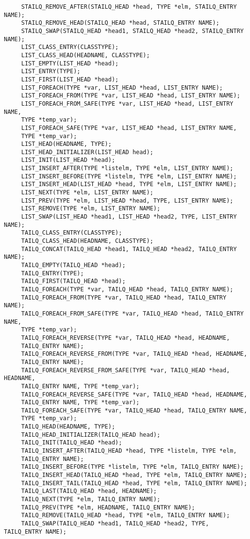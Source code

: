 \documentclass[journal,10pt,onecolumn,compsoc,letterpaper,draftclsnofoot,table,xcdraw]{IEEEtran} \usepackage[margin=0.75in]{geometry}
\begin{document}
\begin{verbatim}
     STAILQ_REMOVE_AFTER(STAILQ_HEAD *head, TYPE *elm, STAILQ_ENTRY NAME);
     STAILQ_REMOVE_HEAD(STAILQ_HEAD *head, STAILQ_ENTRY	NAME);
     STAILQ_SWAP(STAILQ_HEAD *head1, STAILQ_HEAD *head2, STAILQ_ENTRY NAME);
     LIST_CLASS_ENTRY(CLASSTYPE);
     LIST_CLASS_HEAD(HEADNAME, CLASSTYPE);
     LIST_EMPTY(LIST_HEAD *head);
     LIST_ENTRY(TYPE);
     LIST_FIRST(LIST_HEAD *head);
     LIST_FOREACH(TYPE *var, LIST_HEAD *head, LIST_ENTRY NAME);
     LIST_FOREACH_FROM(TYPE *var, LIST_HEAD *head, LIST_ENTRY NAME);
     LIST_FOREACH_FROM_SAFE(TYPE *var, LIST_HEAD *head,	LIST_ENTRY NAME,
	 TYPE *temp_var);
     LIST_FOREACH_SAFE(TYPE *var, LIST_HEAD *head, LIST_ENTRY NAME,
	 TYPE *temp_var);
     LIST_HEAD(HEADNAME, TYPE);
     LIST_HEAD_INITIALIZER(LIST_HEAD head);
     LIST_INIT(LIST_HEAD *head);
     LIST_INSERT_AFTER(TYPE *listelm, TYPE *elm, LIST_ENTRY NAME);
     LIST_INSERT_BEFORE(TYPE *listelm, TYPE *elm, LIST_ENTRY NAME);
     LIST_INSERT_HEAD(LIST_HEAD	*head, TYPE *elm, LIST_ENTRY NAME);
     LIST_NEXT(TYPE *elm, LIST_ENTRY NAME);
     LIST_PREV(TYPE *elm, LIST_HEAD *head, TYPE, LIST_ENTRY NAME);
     LIST_REMOVE(TYPE *elm, LIST_ENTRY NAME);
     LIST_SWAP(LIST_HEAD *head1, LIST_HEAD *head2, TYPE, LIST_ENTRY NAME);
     TAILQ_CLASS_ENTRY(CLASSTYPE);
     TAILQ_CLASS_HEAD(HEADNAME,	CLASSTYPE);
     TAILQ_CONCAT(TAILQ_HEAD *head1, TAILQ_HEAD	*head2,	TAILQ_ENTRY NAME);
     TAILQ_EMPTY(TAILQ_HEAD *head);
     TAILQ_ENTRY(TYPE);
     TAILQ_FIRST(TAILQ_HEAD *head);
     TAILQ_FOREACH(TYPE	*var, TAILQ_HEAD *head,	TAILQ_ENTRY NAME);
     TAILQ_FOREACH_FROM(TYPE *var, TAILQ_HEAD *head, TAILQ_ENTRY NAME);
     TAILQ_FOREACH_FROM_SAFE(TYPE *var,	TAILQ_HEAD *head, TAILQ_ENTRY NAME,
	 TYPE *temp_var);
     TAILQ_FOREACH_REVERSE(TYPE	*var, TAILQ_HEAD *head,	HEADNAME,
	 TAILQ_ENTRY NAME);
     TAILQ_FOREACH_REVERSE_FROM(TYPE *var, TAILQ_HEAD *head, HEADNAME,
	 TAILQ_ENTRY NAME);
     TAILQ_FOREACH_REVERSE_FROM_SAFE(TYPE *var,	TAILQ_HEAD *head, HEADNAME,
	 TAILQ_ENTRY NAME, TYPE	*temp_var);
     TAILQ_FOREACH_REVERSE_SAFE(TYPE *var, TAILQ_HEAD *head, HEADNAME,
	 TAILQ_ENTRY NAME, TYPE	*temp_var);
     TAILQ_FOREACH_SAFE(TYPE *var, TAILQ_HEAD *head, TAILQ_ENTRY NAME,
	 TYPE *temp_var);
     TAILQ_HEAD(HEADNAME, TYPE);
     TAILQ_HEAD_INITIALIZER(TAILQ_HEAD head);
     TAILQ_INIT(TAILQ_HEAD *head);
     TAILQ_INSERT_AFTER(TAILQ_HEAD *head, TYPE *listelm, TYPE *elm,
	 TAILQ_ENTRY NAME);
     TAILQ_INSERT_BEFORE(TYPE *listelm,	TYPE *elm, TAILQ_ENTRY NAME);
     TAILQ_INSERT_HEAD(TAILQ_HEAD *head, TYPE *elm, TAILQ_ENTRY	NAME);
     TAILQ_INSERT_TAIL(TAILQ_HEAD *head, TYPE *elm, TAILQ_ENTRY	NAME);
     TAILQ_LAST(TAILQ_HEAD *head, HEADNAME);
     TAILQ_NEXT(TYPE *elm, TAILQ_ENTRY NAME);
     TAILQ_PREV(TYPE *elm, HEADNAME, TAILQ_ENTRY NAME);
     TAILQ_REMOVE(TAILQ_HEAD *head, TYPE *elm, TAILQ_ENTRY NAME);
     TAILQ_SWAP(TAILQ_HEAD *head1, TAILQ_HEAD *head2, TYPE, TAILQ_ENTRY	NAME);
\end{verbatim}
\newpage


\end{document}
